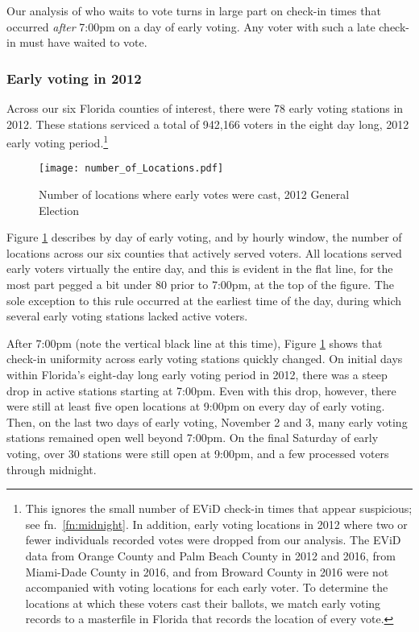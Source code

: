 \documentclass[12pt,titlepage]{article}
\begin{document}
Our analysis of who waits to vote turns in large part on check-in
times that occurred \emph{after} 7:00pm on a day of early voting.  Any
voter with such a late check-in must have waited to vote.

\subsubsection*{Early voting in 2012}

Across our six Florida counties of interest, there were 78 early
voting stations in 2012.  These stations serviced a total of 942,166
voters in the eight day long, 2012 early voting period.\footnote{This
  ignores the small number of EViD check-in times that appear
  suspicious; see fn.\ \ref{fn:midnight}. In addition, early voting
  locations in 2012 where two or fewer individuals recorded votes were
  dropped from our analysis.  The EViD data from Orange County and
  Palm Beach County in 2012 and 2016, from Miami-Dade County in 2016,
  and from Broward County in 2016 were not accompanied with voting
  locations for each early voter. To determine the locations at which
  these voters cast their ballots, we match early voting records to a
  masterfile in Florida that records the location of every
  vote.} %



\begin{figure}[!ht]
  \caption{Number of locations where early votes were cast, 2012 General Election}
  \label{fig:nrlocs2012}
  \centering
    \centering\texttt{[image: number\_of\_Locations.pdf]}
\end{figure}

Figure \ref{fig:nrlocs2012} describes by day of early voting, and by
hourly window, the number of locations across our six counties that
actively served voters. All locations served early voters virtually
the entire day, and this is evident in the flat line, for the most
part pegged a bit under 80 prior to 7:00pm, at the top of the figure.
The sole exception to this rule occurred at the earliest time of the
day, during which several early voting stations lacked active voters.

After 7:00pm (note the vertical black line at this time), Figure
\ref{fig:nrlocs2012} shows that check-in uniformity across early
voting stations quickly changed.  On initial days within Florida's
eight-day long early voting period in 2012, there was a steep drop in
active stations starting at 7:00pm.  Even with this drop, however,
there were still at least five open locations at 9:00pm on every day
of early voting.  Then, on the last two days of early voting, November
2 and 3, many early voting stations remained open well beyond 7:00pm.
On the final Saturday of early voting, over 30 stations were still
open at 9:00pm, and a few processed voters through midnight.
\end{document}
